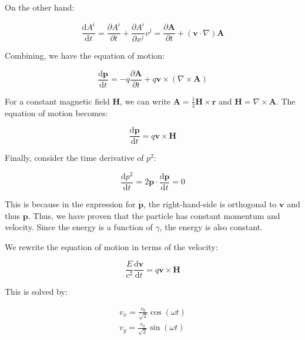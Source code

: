 \documentclass[12pt]{article}
\begin{document}
On the other hand:

\begin{equation}
    \frac{\mathrm{d}A^{i}}{\mathrm{d}t} = \frac{\partial A^{i}}{\partial t} + \frac{\partial A^{i}}{\partial x^{j}} v^{j} = \frac{\partial \mathbf{A}}{\partial t} + (\mathbf{v} \cdot \nabla) \mathbf{A}
\end{equation}

Combining, we have the equation of motion:

\begin{equation}
    \frac{\mathrm{d}\mathbf{p}}{\mathrm{d}t} = -q \frac{\partial \mathbf{A}}{\partial t} + q \mathbf{v} \times (\nabla \times \mathbf{A})
\end{equation}

For a constant magnetic field $\mathbf{H}$, we can write $\mathbf{A} = \frac{1}{2} \mathbf{H} \times \mathbf{r}$ and $\mathbf{H} = \nabla \times \mathbf{A}$. The equation of motion becomes:

\begin{equation}
    \frac{\mathrm{d}\mathbf{p}}{\mathrm{d}t} = q \mathbf{v} \times \mathbf{H}
\end{equation}

Finally, consider the time derivative of $p^{2}$:

\begin{equation}
    \frac{\mathrm{d}p^{2}}{\mathrm{d}t} = 2 \mathbf{p} \cdot \frac{\mathrm{d}\mathbf{p}}{\mathrm{d}t} = 0
\end{equation}

This is because in the expression for $\dot{\mathbf{p}}$, the right-hand-side is orthogonal to $\mathbf{v}$ and thus $\mathbf{p}$. Thus, we have proven that the particle has constant momentum and velocity. Since the energy is a function of $\gamma$, the energy is also constant.

We rewrite the equation of motion in terms of the velocity:

\begin{equation}
    \frac{E}{c^{2}} \frac{\mathrm{d}\mathbf{v}}{\mathrm{d}t} = q \mathbf{v} \times \mathbf{H}
\end{equation}

This is solved by:

\begin{equation}
    \begin{split}
        v_{x} = \frac{v_{0}}{\sqrt{2}} \cos{(\omega t)} \\
        v_{y} = \frac{v_{0}}{\sqrt{2}} \sin{(\omega t)} \\
    \end{split}
\end{equation}
\end{document}
